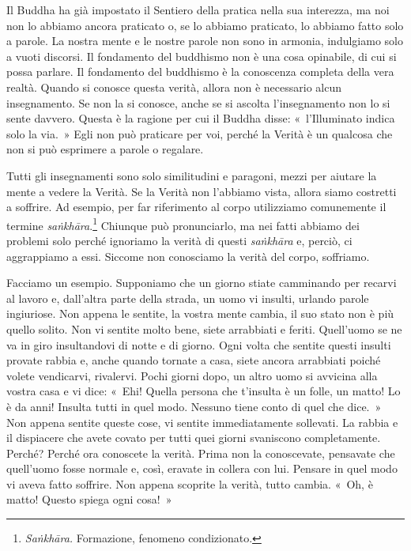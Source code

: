 Il Buddha ha già impostato il Sentiero della pratica nella sua
interezza, ma noi non lo abbiamo ancora praticato o, se lo abbiamo
praticato, lo abbiamo fatto solo a parole. La nostra mente e le nostre
parole non sono in armonia, indulgiamo solo a vuoti discorsi. Il
fondamento del buddhismo non è una cosa opinabile, di cui si possa
parlare. Il fondamento del buddhismo è la conoscenza completa della vera
realtà. Quando si conosce questa verità, allora non è necessario alcun
insegnamento. Se non la si conosce, anche se si ascolta l'insegnamento
non lo si sente davvero. Questa è la ragione per cui il Buddha disse:
«~l'Illuminato indica solo la via.~» Egli non può praticare per voi,
perché la Verità è un qualcosa che non si può esprimere a parole o
regalare.

Tutti gli insegnamenti sono solo similitudini e paragoni, mezzi per
aiutare la mente a vedere la Verità. Se la Verità non l'abbiamo vista,
allora siamo costretti a soffrire. Ad esempio, per far riferimento al
corpo utilizziamo comunemente il termine \emph{saṅkhāra}.\footnote{\emph{Saṅkhāra.}
  Formazione, fenomeno condizionato.} Chiunque può pronunciarlo, ma nei
fatti abbiamo dei problemi solo perché ignoriamo la verità di questi
\emph{saṅkhāra} e, perciò, ci aggrappiamo a essi. Siccome non conosciamo
la verità del corpo, soffriamo.

Facciamo un esempio. Supponiamo che un giorno stiate camminando per
recarvi al lavoro e, dall'altra parte della strada, un uomo vi insulti,
urlando parole ingiuriose. Non appena le sentite, la vostra mente
cambia, il suo stato non è più quello solito. Non vi sentite molto bene,
siete arrabbiati e feriti. Quell'uomo se ne va in giro insultandovi di
notte e di giorno. Ogni volta che sentite questi insulti provate rabbia
e, anche quando tornate a casa, siete ancora arrabbiati poiché volete
vendicarvi, rivalervi. Pochi giorni dopo, un altro uomo si avvicina alla
vostra casa e vi dice: «~Ehi! Quella persona che t'insulta è un folle,
un matto! Lo è da anni! Insulta tutti in quel modo. Nessuno tiene conto
di quel che dice.~» Non appena sentite queste cose, vi sentite
immediatamente sollevati. La rabbia e il dispiacere che avete covato per
tutti quei giorni svaniscono completamente. Perché? Perché ora conoscete
la verità. Prima non la conoscevate, pensavate che quell'uomo fosse
normale e, così, eravate in collera con lui. Pensare in quel modo vi
aveva fatto soffrire. Non appena scoprite la verità, tutto cambia. «~Oh,
è matto! Questo spiega ogni cosa!~»

